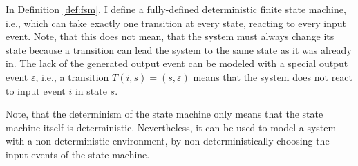 In Definition \ref{def:fsm}, I define a fully-defined deterministic finite state machine, i.e., which can take exactly one transition at every state, reacting to every input event. Note, that this does not mean, that the system must always change its state because a transition can lead the system to the same state as it was already in. The lack of the generated output event can be modeled with a special output event $\varepsilon$, i.e., a transition $T(i, s) = (s, \varepsilon)$ means that the system does not react to input event $i$ in state $s$.

Note, that the determinism of the state machine only means that the state machine itself is deterministic. Nevertheless, it can be used to model a system with a non-deterministic environment, by non-deterministically choosing the input events of the state machine.

